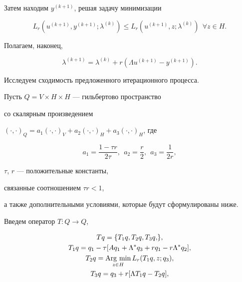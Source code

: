 Затем находим $y^{(k+1)}$, решая задачу минимизации


\begin{equation}


L_r (u^{(k+1)}, y^{(k+1)}; \lambda^{(k)}) \leq


L_r (u^{(k+1)}, z; \lambda^{(k)})


\ \ \forall z \in H.


\label{2bz16}


\end{equation}


Полагаем, наконец,


\begin{equation}


\lambda^{(k+1)}=\lambda^{(k)}+r ({\Lambda u^{(k+1)}-y^{(k+1)}}).


\label{2bz17}


\end{equation}





Исследуем сходимость предложенного итерационного процесса.


Пусть $Q=V \times H \times H$ --- гильбертово пространство


со скалярным произведением


$({\cdot,\cdot})_Q=


a_1 ({\cdot,\cdot})_V+a_2 ({\cdot,\cdot})_H+


a_3 ({\cdot,\cdot})_H$, где


$$


a_1 =\frac {1-\tau r} {2 \tau}, 


\ \ a_2 =\frac {r} {2}, \ \ a_3 =\frac {1} {2 r},


$$


$\tau$, $r$ --- положительные константы, 


связанные соотношением ${\tau r < 1}$,


а также дополнительными условиями, которые будут сформулированы ниже.





Введем оператор $T: Q \to Q$,


\begin{gather}


Tq=\{{T_1q, T_2 q, T_3 q,} \},\notag \\


%


T_1 q=q_1-\tau [{A q_1+\Lambda^* q_3+r q_1-r \Lambda^* q_2}], 


\label{bz_08_0} \\


%


T_2 q=\Argmin_{z \in H} L_r (T_1 q, z; q_3), 


\label{bz_08} \\


%


T_3 q=q_3+r [{\Lambda T_1 q-T_2 q}], 


\label{bz_09}


\end{gather}





